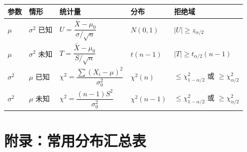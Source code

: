 \documentclass[12pt, a4paper]{article}
\begin{document}
\begin{center}
    \renewcommand{\arraystretch}{2}
    \begin{tabular}{lllll}
        \toprule
        参数         & 情形            & 统计量                                               & 分布 & 拒绝域 \\
        \midrule
        $\mu$      & $\sigma^2$ 已知 & $U=\dfrac{\bar{X}-\mu_0}{\sigma/\sqrt{n}}$
                   & $N(0,1)$      & $|U|\ge z_{\alpha/2}$                                        \\[8pt]
        $\mu$      & $\sigma^2$ 未知 & $T=\dfrac{\bar{X}-\mu_0}{S/\sqrt{n}}$
                   & $t(n-1)$      & $|T|\ge t_{\alpha/2}(n-1)$                                   \\[8pt]
        $\sigma^2$ & $\mu$ 已知      & $\chi^2=\dfrac{\sum(X_i-\mu)^2}{\sigma_0^2}$
                   & $\chi^2(n)$   & $\le\chi^2_{1-\alpha/2}$ 或 $\ge\chi^2_{\alpha/2}$            \\[8pt]
        $\sigma^2$ & $\mu$ 未知      & $\chi^2=\dfrac{(n-1)S^2}{\sigma_0^2}$
                   & $\chi^2(n-1)$ & $\le\chi^2_{1-\alpha/2}$ 或 $\ge\chi^2_{\alpha/2}$            \\
        \bottomrule
    \end{tabular}
\end{center}

\section*{附录：常用分布汇总表}
\end{document}
